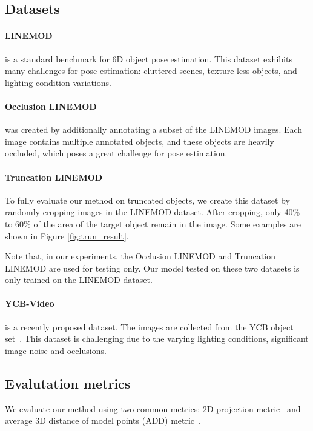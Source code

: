 \documentclass[10pt,twocolumn,letterpaper]{article}
\begin{document}
\subsection{Datasets}

\paragraph{LINEMOD~\cite{hinterstoisser2012model}} is a standard benchmark for 6D object pose estimation. This dataset exhibits many challenges for pose estimation: cluttered scenes, texture-less objects, and lighting condition variations.

\paragraph{Occlusion LINEMOD~\cite{brachmann2014learning}} was created by additionally annotating a subset of the LINEMOD images. Each image contains multiple annotated objects, and these objects are heavily occluded, which poses a great challenge for pose estimation.

\paragraph{Truncation LINEMOD} To fully evaluate our method on truncated objects, we create this dataset by randomly cropping images in the LINEMOD dataset. After cropping, only 40\% to 60\% of the area of the target object remain in the image. 
Some examples are shown in Figure \ref{fig:trun_result}. 

Note that, in our experiments, the Occlusion LINEMOD and Truncation LINEMOD are used for testing only. Our model tested on these two datasets is only trained on the LINEMOD dataset.

\paragraph{YCB-Video~\cite{xiang2017posecnn}} is a recently proposed dataset. The images are collected from the YCB object set~\cite{calli2015ycb}. This dataset is challenging due to the varying lighting conditions, significant image noise and occlusions.

\subsection{Evalutation metrics}

We evaluate our method using two common metrics: 2D projection metric~\cite{brachmann2016uncertainty} and average 3D distance of model points (ADD) metric~\cite{hinterstoisser2012model}.
\end{document}
